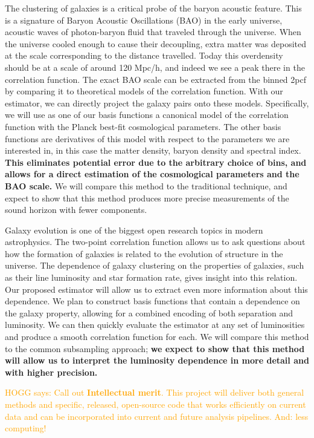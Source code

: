 \documentclass[12pt, fullpage, letterpaper]{article}
\newcommand{\HOGG}[1]{\textcolor{orange}{HOGG says: #1}}
\newcommand{\cf}{2pcf\xspace}
\begin{document}
The clustering of galaxies is a critical probe of the baryon acoustic feature. 
This is a signature of Baryon Acoustic Oscillations (BAO) in the early universe, acoustic waves of photon-baryon fluid that traveled through the universe. 
When the universe cooled enough to cause their decoupling, extra matter was deposited at the scale corresponding to the distance travelled. 
Today this overdensity should be at a scale of around 120 Mpc/h, and indeed we see a peak there in the correlation function. 
The exact BAO scale can be extracted from the binned \cf by comparing it to theoretical models of the correlation function. 
With our estimator, we can directly project the galaxy pairs onto these models. 
Specifically, we will use as one of our basis functions a canonical model of the correlation function with the Planck best-fit cosmological parameters. 
The other basis functions are derivatives of this model with respect to the parameters we are interested in, in this case the matter density, baryon density and spectral index.
\textbf{This eliminates potential error due to the arbitrary choice of bins, and allows for a direct estimation of the cosmological parameters and the BAO scale.}
We will compare this method to the traditional technique, and expect to show that this method produces more precise measurements of the sound horizon with fewer components.

Galaxy evolution is one of the biggest open research topics in modern astrophysics.
The two-point correlation function allows us to ask questions about how the formation of galaxies is related to the evolution of structure in the universe.
The dependence of galaxy clustering on the properties of galaxies, such as their line luminosity and star formation rate, gives insight into this relation.
Our proposed estimator will allow us to extract even more information about this dependence. 
We plan to construct basis functions that contain a dependence on the galaxy property, allowing for a combined encoding of both separation and luminosity. 
We can then quickly evaluate the estimator at any set of luminosities and produce a smooth correlation function for each. 
We will compare this method to the common subsampling approach; \textbf{we expect to show that this method will allow us to interpret the luminosity dependence in more detail and with higher precision.}

\HOGG{Call out \textbf{Intellectual merit}.
This project will deliver both general methods and specific, released,
open-source code that works efficiently on current data and can be
incorporated into current and future analysis pipelines. And: less computing!}
\end{document}
